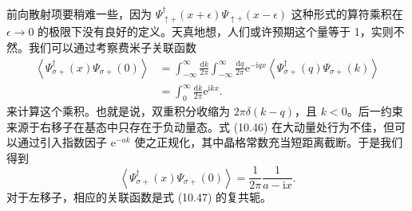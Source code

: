 前向散射项要稍难一些，因为 $\Psi_{\uparrow+}^{\dagger}(x+\epsilon)\Psi_{\uparrow+}(x-\epsilon)$ 这种形式的算符乘积在 $\epsilon\to 0$ 的极限下没有良好的定义。天真地想，人们或许预期这个量等于 1，实则不然。我们可以通过考察费米子关联函数
\begin{align*}
\left\langle\Psi_{\sigma+}^{\dagger}(x)\Psi_{\sigma+}(0)\right\rangle&=\int_{-\infty}^{\infty}\frac{\mathrm{d}k}{2\pi}\int_{-\infty}^{\infty}\frac{\mathrm{d}q}{2\pi}\mathrm{e}^{-\mathrm{i}qx}\left\langle\Psi_{\sigma+}^{\dagger}(q)\Psi_{\sigma+}(k)\right\rangle\\
&=\int_{0}^{\infty}\frac{\mathrm{d}k}{2\pi}\mathrm{e}^{\mathrm{i}kx}.
\tag{10.46}
\end{align*}
来计算这个乘积。也就是说，双重积分收缩为 $2\pi\delta(k-q)$，且 $k<0$。后一约束来源于右移子在基态中只存在于负动量态。式 (10.46) 在大动量处行为不佳，但可以通过引入指数因子 $\mathrm{e}^{-ak}$ 使之正规化，其中晶格常数充当短距离截断。于是我们得到
\begin{equation*}
\left\langle\Psi_{\sigma+}^{\dagger}(x)\Psi_{\sigma+}(0)\right\rangle=\frac{1}{2\pi}\frac{1}{a-\mathrm{i}x}.
\tag{10.47}
\end{equation*}
对于左移子，相应的关联函数是式 (10.47) 的复共轭。

